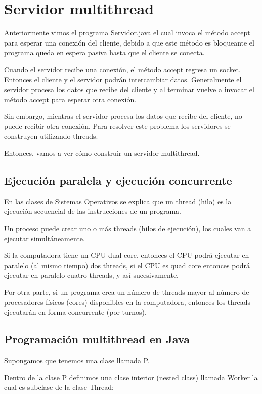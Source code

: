 \documentclass[11pt,a4paper,oneside]{book}
\begin{document}
\chapter{Servidor multithread}

Anteriormente vimos el programa Servidor.java el cual invoca el método accept para esperar una conexión del cliente, debido a que este método es bloqueante el programa queda en espera pasiva hasta que el cliente se conecta.

Cuando el servidor recibe una conexión, el método accept regresa un socket. Entonces el cliente y el servidor podrán intercambiar datos. Generalmente el servidor procesa los datos que recibe del cliente y al terminar vuelve a invocar el método accept para esperar otra conexión.

Sin embargo, mientras el servidor procesa los datos que recibe del cliente, no puede recibir otra conexión. Para resolver este problema los servidores se construyen utilizando threads.

Entonces, vamos a ver cómo construir un servidor multithread.

\section{Ejecución paralela y ejecución concurrente}

En las clases de Sistemas Operativos se explica que un thread (hilo) es la ejecución secuencial de las instrucciones de un programa.

Un proceso puede crear uno o más threads (hilos de ejecución), los cuales van a ejecutar simultáneamente.

Si la computadora tiene un CPU dual core, entonces el CPU podrá ejecutar en paralelo (al mismo tiempo) dos threads, si el CPU es quad core entonces podrá ejecutar en paralelo cuatro threads, y así sucesivamente.

Por otra parte, si un programa crea un número de threads mayor al número de procesadores físicos (cores) disponibles en la computadora, entonces los threads ejecutarán en forma concurrente (por turnos).

\section{Programación multithread en Java}

Supongamos que tenemos una clase llamada P.

Dentro de la clase P definimos una clase interior (nested class) llamada Worker la cual es subclase de la clase Thread:
\end{document}
